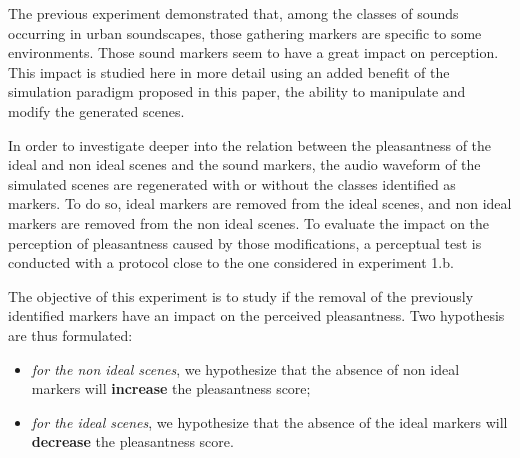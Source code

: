 \documentclass[12pt]{elsarticle}
\begin{document}
The previous experiment demonstrated that, among the classes of sounds occurring in urban soundscapes, those gathering markers are specific to some environments. Those sound markers seem to have a great impact on perception. This impact is studied here in more detail using an added benefit of the simulation paradigm proposed in this paper, the ability to manipulate and modify the generated scenes.


In order to investigate deeper into the relation between the pleasantness of the ideal and non ideal scenes and the sound markers, the audio waveform of the simulated scenes are regenerated with or without the classes identified as markers. To do so, ideal markers are removed from the ideal scenes, and non ideal markers are removed from the non ideal scenes. To evaluate the impact on the perception of pleasantness caused by those modifications, a perceptual test is conducted with a protocol close to the one considered in experiment 1.b.


The objective of this experiment is to study if the removal of the previously identified markers have an impact on the perceived pleasantness. Two hypothesis are thus formulated:


\begin{itemize}
\item \emph{for the non ideal scenes}, we hypothesize that the absence of non ideal markers will \textbf{increase} the pleasantness score;
\item \emph{for the ideal scenes}, we hypothesize that the absence of the ideal markers will \textbf{decrease} the pleasantness score.
\end{itemize}
\end{document}
